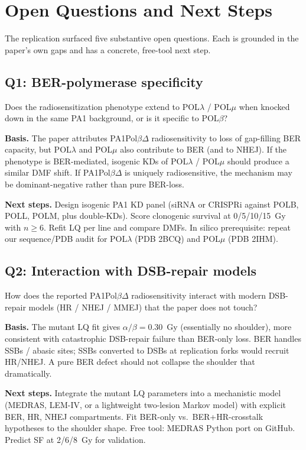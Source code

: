 \section{Open Questions and Next Steps}

The replication surfaced five substantive open questions. Each is grounded in the paper's own gaps and has a concrete, free-tool next step.

\subsection{Q1: BER-polymerase specificity}
Does the radiosensitization phenotype extend to POL$\lambda$ / POL$\mu$ when knocked down in the same PA1 background, or is it specific to POL$\beta$?

\textbf{Basis.} The paper attributes PA1Pol$\beta\Delta$ radiosensitivity to loss of gap-filling BER capacity, but POL$\lambda$ and POL$\mu$ also contribute to BER (and to NHEJ). If the phenotype is BER-mediated, isogenic KDs of POL$\lambda$ / POL$\mu$ should produce a similar DMF shift. If PA1Pol$\beta\Delta$ is uniquely radiosensitive, the mechanism may be dominant-negative rather than pure BER-loss.

\textbf{Next steps.} Design isogenic PA1 KD panel (siRNA or CRISPRi against POLB, POLL, POLM, plus double-KDs). Score clonogenic survival at 0/5/10/15~Gy with $n \geq 6$. Refit LQ per line and compare DMFs. In silico prerequisite: repeat our sequence/PDB audit for POL$\lambda$ (PDB 2BCQ) and POL$\mu$ (PDB 2IHM).

\subsection{Q2: Interaction with DSB-repair models}
How does the reported PA1Pol$\beta\Delta$ radiosensitivity interact with modern DSB-repair models (HR / NHEJ / MMEJ) that the paper does not touch?

\textbf{Basis.} The mutant LQ fit gives $\alpha/\beta = 0.30$~Gy (essentially no shoulder), more consistent with catastrophic DSB-repair failure than BER-only loss. BER handles SSBs / abasic sites; SSBs converted to DSBs at replication forks would recruit HR/NHEJ. A pure BER defect should not collapse the shoulder that dramatically.

\textbf{Next steps.} Integrate the mutant LQ parameters into a mechanistic model (MEDRAS, LEM-IV, or a lightweight two-lesion Markov model) with explicit BER, HR, NHEJ compartments. Fit BER-only vs.\ BER+HR-crosstalk hypotheses to the shoulder shape. Free tool: MEDRAS Python port on GitHub. Predict SF at 2/6/8~Gy for validation.

